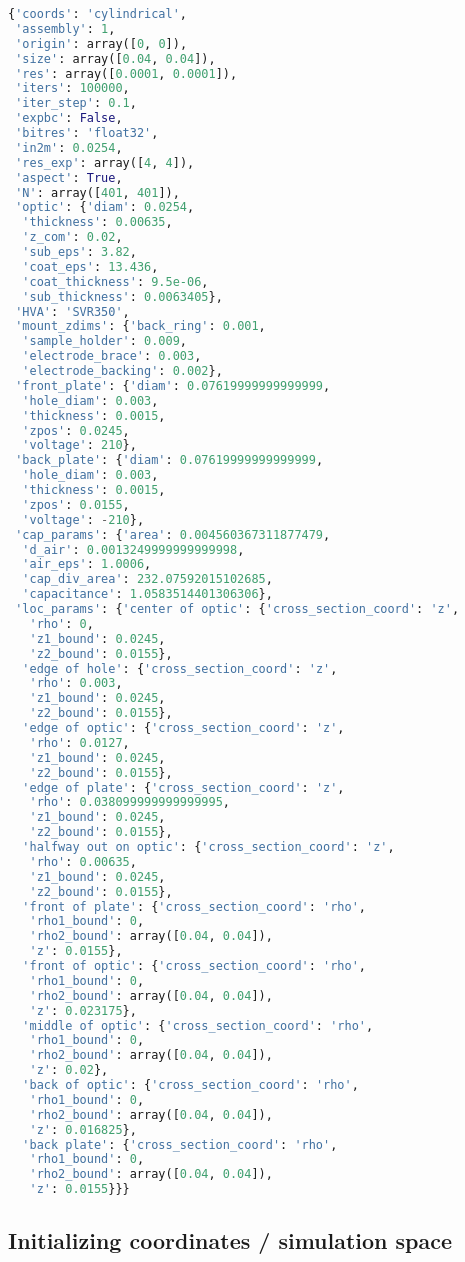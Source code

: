 \begin{spacing}{1} \begin{lstlisting}[frame=single, language=Python]
{'coords': 'cylindrical',
 'assembly': 1,
 'origin': array([0, 0]),
 'size': array([0.04, 0.04]),
 'res': array([0.0001, 0.0001]),
 'iters': 100000,
 'iter_step': 0.1,
 'expbc': False,
 'bitres': 'float32',
 'in2m': 0.0254,
 'res_exp': array([4, 4]),
 'aspect': True,
 'N': array([401, 401]),
 'optic': {'diam': 0.0254,
  'thickness': 0.00635,
  'z_com': 0.02,
  'sub_eps': 3.82,
  'coat_eps': 13.436,
  'coat_thickness': 9.5e-06,
  'sub_thickness': 0.0063405},
 'HVA': 'SVR350',
 'mount_zdims': {'back_ring': 0.001,
  'sample_holder': 0.009,
  'electrode_brace': 0.003,
  'electrode_backing': 0.002},
 'front_plate': {'diam': 0.07619999999999999,
  'hole_diam': 0.003,
  'thickness': 0.0015,
  'zpos': 0.0245,
  'voltage': 210},
 'back_plate': {'diam': 0.07619999999999999,
  'hole_diam': 0.003,
  'thickness': 0.0015,
  'zpos': 0.0155,
  'voltage': -210},
 'cap_params': {'area': 0.004560367311877479,
  'd_air': 0.0013249999999999998,
  'air_eps': 1.0006,
  'cap_div_area': 232.07592015102685,
  'capacitance': 1.0583514401306306},
 'loc_params': {'center of optic': {'cross_section_coord': 'z',
   'rho': 0,
   'z1_bound': 0.0245,
   'z2_bound': 0.0155},
  'edge of hole': {'cross_section_coord': 'z',
   'rho': 0.003,
   'z1_bound': 0.0245,
   'z2_bound': 0.0155},
  'edge of optic': {'cross_section_coord': 'z',
   'rho': 0.0127,
   'z1_bound': 0.0245,
   'z2_bound': 0.0155},
  'edge of plate': {'cross_section_coord': 'z',
   'rho': 0.038099999999999995,
   'z1_bound': 0.0245,
   'z2_bound': 0.0155},
  'halfway out on optic': {'cross_section_coord': 'z',
   'rho': 0.00635,
   'z1_bound': 0.0245,
   'z2_bound': 0.0155},
  'front of plate': {'cross_section_coord': 'rho',
   'rho1_bound': 0,
   'rho2_bound': array([0.04, 0.04]),
   'z': 0.0155},
  'front of optic': {'cross_section_coord': 'rho',
   'rho1_bound': 0,
   'rho2_bound': array([0.04, 0.04]),
   'z': 0.023175},
  'middle of optic': {'cross_section_coord': 'rho',
   'rho1_bound': 0,
   'rho2_bound': array([0.04, 0.04]),
   'z': 0.02},
  'back of optic': {'cross_section_coord': 'rho',
   'rho1_bound': 0,
   'rho2_bound': array([0.04, 0.04]),
   'z': 0.016825},
  'back plate': {'cross_section_coord': 'rho',
   'rho1_bound': 0,
   'rho2_bound': array([0.04, 0.04]),
   'z': 0.0155}}}
\end{lstlisting} \end{spacing}

\hypertarget{initializing-coordinates-simulation-space}{%
\subsection{Initializing coordinates / simulation
space}\label{initializing-coordinates-simulation-space}}


